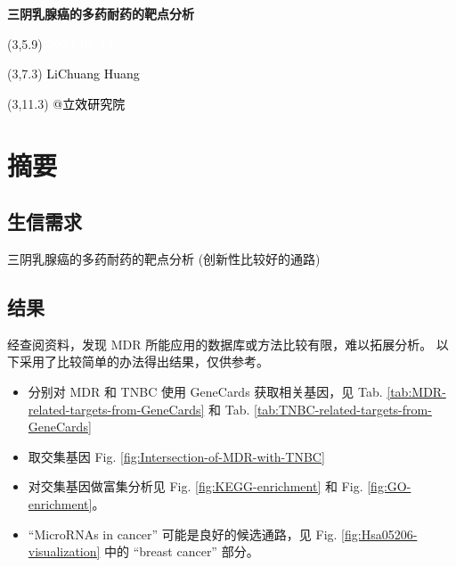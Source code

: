 \documentclass[
]{article}
\author{}
\date{\vspace{-2.5em}}
\providecommand{\tightlist}{%
  \setlength{\itemsep}{0pt}\setlength{\parskip}{0pt}}
\begin{document}
\begin{titlepage} 
\begin{center} \textbf{\Huge
三阴乳腺癌的多药耐药的靶点分析} \vspace{4em}
\begin{textblock}{10}(3,5.9) \huge
\textbf{\textcolor{white}{2024-05-14}}
\end{textblock} \begin{textblock}{10}(3,7.3)
\Large \textcolor{black}{LiChuang Huang}
\end{textblock} \begin{textblock}{10}(3,11.3)
\Large \textcolor{black}{@立效研究院}
\end{textblock} \end{center} \end{titlepage}
\restoregeometry


\tableofcontents

\listoffigures

\listoftables

\newpage


\hypertarget{abstract}{%
\section{摘要}\label{abstract}}

\hypertarget{ux751fux4fe1ux9700ux6c42}{%
\subsection{生信需求}\label{ux751fux4fe1ux9700ux6c42}}

三阴乳腺癌的多药耐药的靶点分析 (创新性比较好的通路)

\hypertarget{ux7ed3ux679c}{%
\subsection{结果}\label{ux7ed3ux679c}}

经查阅资料，发现 MDR 所能应用的数据库或方法比较有限，难以拓展分析。
以下采用了比较简单的办法得出结果，仅供参考。

\begin{itemize}
\tightlist
\item
  分别对 MDR 和 TNBC 使用 GeneCards 获取相关基因，见
  Tab. \ref{tab:MDR-related-targets-from-GeneCards} 和
  Tab. \ref{tab:TNBC-related-targets-from-GeneCards}
\item
  取交集基因 Fig. \ref{fig:Intersection-of-MDR-with-TNBC}
\item
  对交集基因做富集分析见 Fig. \ref{fig:KEGG-enrichment} 和 Fig. \ref{fig:GO-enrichment}。
\item
  ``MicroRNAs in cancer'' 可能是良好的候选通路，见 Fig. \ref{fig:Hsa05206-visualization} 中的 ``breast cancer'' 部分。
\end{itemize}
\end{document}
